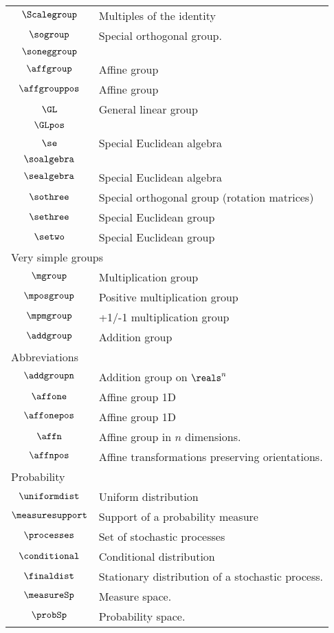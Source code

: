 \begin{longtable}{cl}
 $\Scalegroup$ &   Multiples of the identity\\ 
 $\sogroup$ &  Special orthogonal group.\\ 
 $\soneggroup$ & \\ 
 $\affgroup$ &  Affine group \\ 
 $\affgrouppos$ &  Affine group \\ 
 $\GL$ &  General linear group\\ 
 $\GLpos$ &  \\ 
 $\se$ &  Special Euclidean algebra\\ 
 $\soalgebra$ & \\ 
 $\sealgebra$ &  Special Euclidean algebra\\ 
 $\sothree$ &  Special orthogonal group (rotation matrices)\\ 
 $\sethree$ &  Special Euclidean group \\ 
 $\setwo$ &  Special Euclidean group \\ 
 \multicolumn{2}{l}{Very simple groups}\\ 
 \hline
$\mgroup$ &  Multiplication group\\ 
 $\mposgroup$ &  Positive multiplication group\\ 
 $\mpmgroup$ &  +1/-1 multiplication group\\ 
 $\addgroup$ &  Addition group\\ 
 \multicolumn{2}{l}{Abbreviations}\\ 
 \hline
$\addgroupn$ &  Addition group on $\reals^n$\\ 
 $\affone$ &  Affine group 1D\\ 
 $\affonepos$ &  Affine group 1D\\ 
 $\affn$ &  Affine group in $n$ dimensions.\\ 
 $\affnpos$ &  Affine transformations preserving orientations.\\ 
 \multicolumn{2}{l}{Probability}\\ 
 \hline
$\uniformdist$ &  Uniform distribution\\ 
 $\measuresupport$ &  Support of a probability measure\\ 
 $\processes$ &  Set of stochastic processes\\ 
 $\conditional$ &  Conditional distribution\\ 
 $\finaldist$ &  Stationary distribution of a stochastic process.\\ 
 $\measureSp$ &  Measure space.\\ 
 $\probSp$ &  Probability space.\\ 

\end{longtable}
